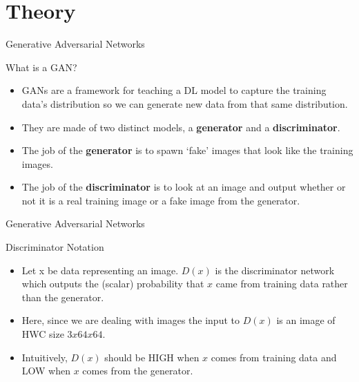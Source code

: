 \documentclass[10pt]{beamer}
\begin{document}
\section{Theory}

{
\begin{frame}{Generative Adversarial Networks}
      \begin{block}{What is a GAN?}
	\begin{itemize}[<+- | alert@+>]
    \item GANs are a framework for teaching a DL model to capture the training data’s distribution so we can generate new data from that same distribution.
    \item They are made of two distinct models, a \textbf{generator} and a \textbf{discriminator}.
    \item The job of the \textbf{generator} is to spawn ‘fake’ images that look like the training images.
    \item The job of the \textbf{discriminator} is to look at an image and output whether or not it is a real training image or a fake image from the generator.
  \end{itemize}
    \end{block}
\end{frame}
}

{
\begin{frame}{Generative Adversarial Networks}
      \begin{block}{Discriminator Notation}
	\begin{itemize}[<+- | alert@+>]
    \item Let x be data representing an image. $D(x)$ is the discriminator network which outputs the (scalar) probability that $x$ came from training data rather than the generator. 
    \item Here, since we are dealing with images the input to $D(x)$ is an image of HWC size $3x64x64$. \item Intuitively, $D(x)$ should be HIGH when $x$ comes from training data and LOW when $x$ comes from the generator.
  \end{itemize}
    \end{block}
\end{frame}
}
\end{document}
